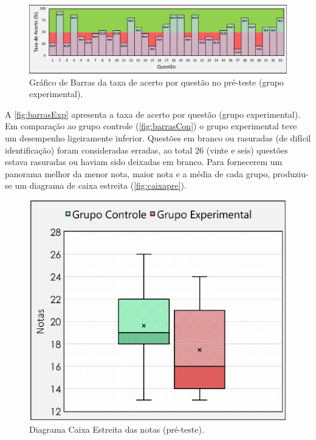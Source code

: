 \begin{figure}[htb]

    \caption{\label{fig:barrasExp}Gráfico de Barras da taxa de acerto por questão no pré-teste (grupo experimental).}
    \includegraphics[width=\linewidth]{./Visuais/Notas3.pdf}
  
\end{figure}

A \autoref{fig:barrasExp} apresenta a taxa de acerto por questão (grupo experimental). Em comparação ao grupo controle (\autoref{fig:barrasCon}) o grupo experimental teve um desempenho ligeiramente inferior. Questões em branco ou rasuradas (de difícil identificação) foram consideradas erradas, ao total 26 (vinte e seis) questões estava rasuradas ou haviam sido deixadas em branco. Para fornecerem um panorama melhor da menor nota, maior nota e a média de cada grupo, produziu-se um diagrama de caixa estreita (\autoref{fig:caixapre}).


\begin{figure}%
    \vspace{-4pt}
    \caption{\label{fig:caixapre}Diagrama Caixa Estreita das notas (pré-teste).}
    \vspace{8pt}
    \includegraphics[width=\linewidth]{./Visuais/CaixaEstreitaEnfeitado.pdf}
\end{figure}

